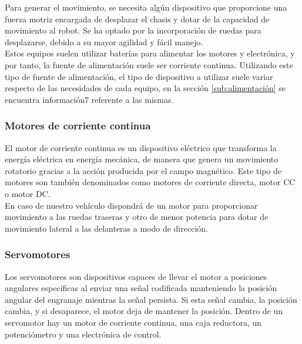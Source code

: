 Para generar el movimiento, se necesita algún dispositivo que proporcione una fuerza motriz encargada de desplazar el chasis y dotar de la capacidad de movimiento al robot.
Se ha optado por la incorporación de ruedas para desplazarse, debido a su mayor agilidad y fácil manejo.\\

Estos equipos suelen utilizar baterías para alimentar los motores y electrónica, y por tanto, la fuente de alimentación suele ser corriente continua. Utilizando este tipo de
fuente de alimentación, el tipo de dispositivo a utilizar suele variar respecto de las necesidades de cada equipo, en la sección \ref{sub:alimentación} se encuentra información7
referente a las mismas.\\

\subsubsection{Motores de corriente continua}

El motor de corriente continua es un dispositivo eléctrico que transforma la energía eléctrica en energía mecánica, de manera que genera un movimiento rotatorio gracias a la  
acción producida por el campo magnético. Este tipo de motores son también denominados como motores de corriente directa, motor CC o motor DC.\\

En caso de nuestro vehículo dispondrá de un motor para proporcionar movimiento a las ruedas traseras y otro de menor potencia para dotar de movimiento lateral a las delanteras 
a modo de dirección.\\

\subsubsection{Servomotores}

Los servomotores son dispositivos capaces de llevar el motor a posiciones angulares específicas al enviar una señal codificada manteniendo la  posición  angular  del  engranaje
mientras la señal persista. Si esta señal cambia, la posición cambia, y si desaparece, el motor deja de mantener la posición. Dentro de un servomotor hay un motor de corriente
continua, una caja reductora, un potenciómetro y una electrónica de control.\\


